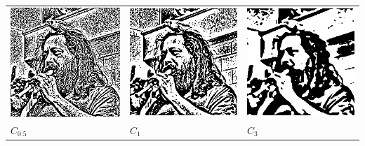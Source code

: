 \begin{tabular}{lll}
	\includegraphics{weiro-ca.png} &
	\includegraphics{weiro-cb.png} &
	\includegraphics{weiro-cc.png} \\
	$C_{0.5}$ &
	$C_{1}$ &
	$C_{3}$ \\
\end{tabular}

